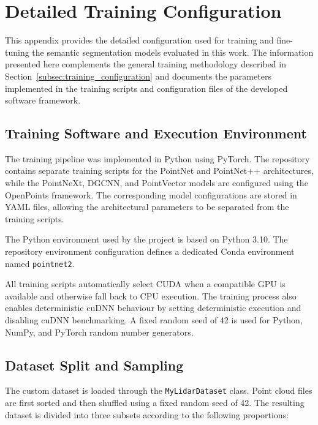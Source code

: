 \chapter{Detailed Training Configuration}
\label{app:training_configuration}

This appendix provides the detailed configuration used for training and fine-tuning the semantic segmentation models evaluated in this work. The information presented here complements the general training methodology described in Section~\ref{subsec:training_configuration} and documents the parameters implemented in the training scripts and configuration files of the developed software framework.

\section{Training Software and Execution Environment}
\label{app:training_environment}

The training pipeline was implemented in Python using PyTorch. The repository contains separate training scripts for the PointNet and PointNet++ architectures, while the PointNeXt, DGCNN, and PointVector models are configured using the OpenPoints framework. The corresponding model configurations are stored in YAML files, allowing the architectural parameters to be separated from the training scripts.

The Python environment used by the project is based on Python 3.10. The repository environment configuration defines a dedicated Conda environment named \texttt{pointnet2}.

All training scripts automatically select CUDA when a compatible GPU is available and otherwise fall back to CPU execution. The training process also enables deterministic cuDNN behaviour by setting deterministic execution and disabling cuDNN benchmarking. A fixed random seed of 42 is used for Python, NumPy, and PyTorch random number generators.

\section{Dataset Split and Sampling}
\label{app:dataset_sampling}

The custom dataset is loaded through the \texttt{MyLidarDataset} class. Point cloud files are first sorted and then shuffled using a fixed random seed of 42. The resulting dataset is divided into three subsets according to the following proportions:

